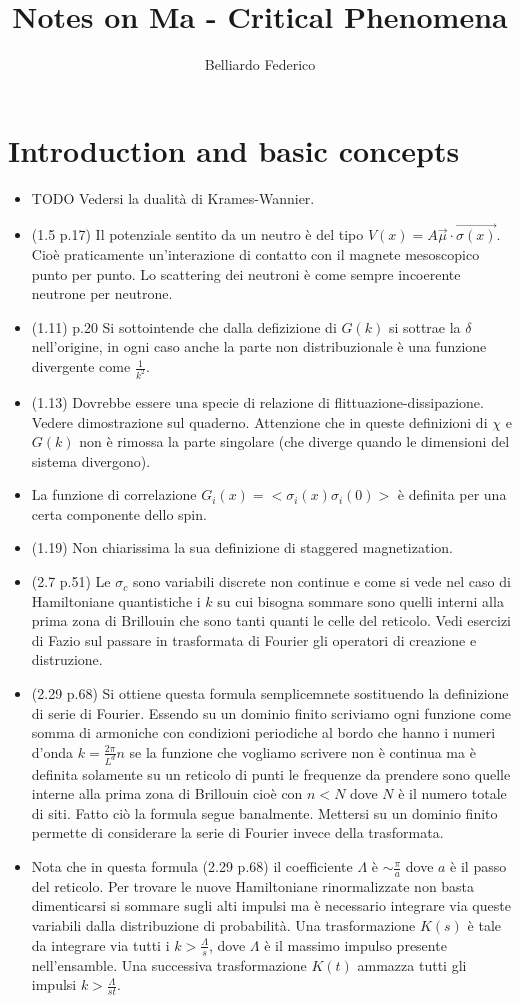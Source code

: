 \documentclass[10pt,a4paper]{article}
\author{Belliardo Federico}
\title{Notes on Ma - Critical Phenomena}
\begin{document}
\maketitle
\section{Introduction and basic concepts}
\begin{itemize}
\item TODO Vedersi la dualità di Krames-Wannier.
\item (1.5 p.17) Il potenziale sentito da un neutro è del tipo $V(x) = A \vec{\mu} \cdot \vec{\sigma (x)}$. Cioè praticamente un'interazione di contatto con il magnete mesoscopico punto per punto. Lo scattering dei neutroni è come sempre incoerente neutrone per neutrone.
\item (1.11) p.20 Si sottointende che dalla defizizione di $G(k)$ si sottrae la $\delta$ nell'origine, in ogni caso anche la parte non distribuzionale è una funzione divergente come $\frac{1}{k^2}$.
\item (1.13) Dovrebbe essere una specie di relazione di flittuazione-dissipazione. Vedere dimostrazione sul quaderno. Attenzione che in queste definizioni di $\chi$ e $G(k)$ non è rimossa la parte singolare (che diverge quando le dimensioni del sistema divergono).
\item La funzione di correlazione $G_i(x) = <\sigma_i(x) \sigma_i(0)>$ è definita per una certa componente dello spin.
\item (1.19) Non chiarissima la sua definizione di staggered magnetization.
\item (2.7 p.51) Le $\sigma_c$ sono variabili discrete non continue e come si vede nel caso di Hamiltoniane quantistiche i $k$ su cui bisogna sommare sono quelli interni alla prima zona di Brillouin che sono tanti quanti le celle del reticolo. Vedi esercizi di Fazio sul passare in trasformata di Fourier gli operatori di creazione e distruzione.
\item (2.29 p.68) Si ottiene questa formula semplicemnete sostituendo la definizione di serie di Fourier. Essendo su un dominio finito scriviamo ogni funzione come somma di armoniche con condizioni periodiche al bordo che hanno i numeri d'onda $k = \frac{2 \pi}{L^d} n$ se la funzione che vogliamo scrivere non è continua ma è definita solamente su un reticolo di punti le frequenze da prendere sono quelle interne alla prima zona di Brillouin cioè con $n < N$ dove $N$ è il numero totale di siti. Fatto ciò la formula segue banalmente. Mettersi su un dominio finito permette di considerare la serie di Fourier invece della trasformata.
\item Nota che in questa formula (2.29 p.68) il coefficiente $\Lambda$ è $\sim \frac{\pi}{a}$ dove $a$ è il passo del reticolo. Per trovare le nuove Hamiltoniane rinormalizzate non basta dimenticarsi si sommare sugli alti impulsi ma è necessario integrare via queste variabili dalla distribuzione di probabilità. Una trasformazione $K(s)$ è tale da integrare via tutti i $k > \frac{\Lambda}{s}$, dove $\Lambda$ è il massimo impulso presente nell'ensamble. Una successiva trasformazione $K(t)$ ammazza tutti gli impulsi $k > \frac{\Lambda}{st}$.
\end{itemize}
\end{document}

